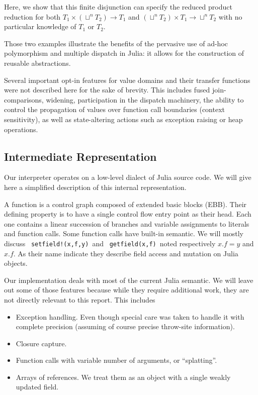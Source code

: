 \documentclass[11pt]{article}
\begin{document}
Here, we show that this finite disjunction can specify the reduced product reduction for both $T_1\times\left(\sqcup^nT_2\right)\to T_1$ and $\left(\sqcup^nT_2\right)\times T_1 \to \sqcup^nT_2$ with no particular knowledge of $T_1$ or $T_2$.

Those two examples illustrate the benefits of the pervasive use of ad-hoc polymorphism and multiple dispatch in Julia: it allows for the construction of reusable abstractions.

Several important opt-in features for value domains and their transfer functions were not described here for the sake of brevity. This includes fused join-comparisons, widening, participation in the dispatch machinery, the ability to control the propagation of values over function call boundaries (context sensitivity), as well as state-altering actions such as exception raising or heap operations.

\subsection*{Intermediate Representation}

Our interpreter operates on a low-level dialect of Julia source code.
We will give here a simplified description of this internal representation.

A function is a control graph composed of extended basic blocks (EBB). Their defining property is to have a single control flow entry point as their head. Each one contains a linear succession of branches and variable assignments to literals and function calls. Some function calls have built-in semantic. We will mostly discuss \ \verb~setfield!(x,f,y)~\  and \ \verb~getfield(x,f)~\  noted respectively $x.f=y$ and $x.f$.
As their name indicate they describe field access and mutation on Julia objects.

Our implementation deals with most of the current Julia semantic.
We will leave out some of those features because while they require additional work, they are not directly relevant to this report. This includes
\begin{itemize}
\item Exception handling. Even though special care was taken to handle it with complete precision (assuming of course precise throw-site information).
\item Closure capture.
\item Function calls with variable number of arguments, or ``splatting''.
\item Arrays of references. We treat them as an object with a single weakly updated field.
\end{itemize}
\end{document}
